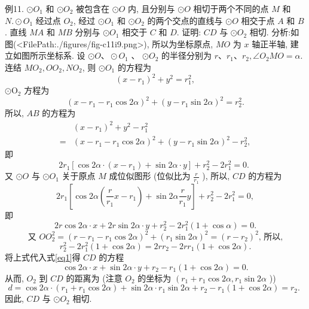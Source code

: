 例11. $ \odot O_1$ 和 $\odot O_2$ 被包含在 $\odot O$ 内, 且分别与 $\odot O$ 相切于两个不同的点 $M$ 和 $N . \odot O_1$ 经过点 $O_2$, 经过 $\odot O_1$ 和 $\odot O_2$ 的两个交点的直线与 $\odot O$ 相交于点 $A$ 和 $B$. 直线 $M A$ 和 $M B$ 分别与 $\odot O_1$ 相交于 $C$ 和 $D$. 证明: $C D$ 与 $\odot O_2$
相切.
分析:如图(<FilePath:./figures/fig-c11i9.png>), 所以为坐标原点, $M O$ 为 $x$ 轴正半轴, 建立如图所示坐标系.
设 $\odot O 、 \odot O_1$ 、 $\odot O_2$ 的半径分别为 $r 、 r_1 、 r_2, \angle O_2 M O=\alpha$. 连结 $M O_2, O O_2, N O_2$, 则 $\odot O_1$ 的方程为
$$
\left(x-r_1\right)^2+y^2=r_1^2,
$$
$\odot \mathrm{O}_2$ 方程为
$$
\left(x-r_1-r_1 \cos 2 \alpha\right)^2+\left(y-r_1 \sin 2 \alpha\right)^2=r_2^2 .
$$
所以, $A B$ 的方程为
$$
\begin{aligned}
& \left(x-r_1\right)^2+y^2-r_1^2 \\
= & \left(x-r_1-r_1 \cos 2 \alpha\right)^2+\left(y-r_1 \sin 2 \alpha\right)^2-r_2^2,
\end{aligned}
$$
即
$$
2 r_1\left[\cos 2 \alpha \cdot\left(x-r_1\right)+\sin 2 \alpha \cdot y\right]+r_2^2-2 r_1^2=0 \text {. }
$$
又 $\odot O$ 与 $\odot O_1$ 关于原点 $M$ 成位似图形 (位似比为 $\frac{r}{r_1}$ ), 所以, $C D$ 的方程为
$$
2 r_1\left[\cos 2 \alpha\left(\frac{r}{r_1} x-r_1\right)+\sin 2 \alpha \frac{r}{r_1} y\right]+r_2^2-2 r_1^2=0,
$$
即
$$
2 r \cos 2 \alpha \cdot x+2 r \sin 2 \alpha \cdot y+r_2^2-2 r_1^2(1+\cos \alpha)=0 . \label{eq1}
$$
$$
\text { 又 } O O_2^2=\left(r-r_1-r_1 \cos 2 \alpha\right)^2+\left(r_1 \sin 2 \alpha\right)^2=\left(r-r_2\right)^2 \text {, 所以, }
$$
$$
r_2^2-2 r_1^2(1+\cos 2 \alpha)=2 r r_2-2 r r_1(1+\cos 2 \alpha) .
$$
将上式代入式\ref{eq1}得 $C D$ 的方程
$$
\cos 2 \alpha \cdot x+\sin 2 \alpha \cdot y+r_2-r_1(1+\cos 2 \alpha)=0 .
$$
从而, $O_2$ 到 $C D$ 的距离为 (注意 $O_2$ 的坐标为 $\left(r_1+r_1 \cos 2 \alpha, r_1 \sin 2 \alpha\right.$ ))
$$
d=\cos 2 \alpha \cdot\left(r_1+r_1 \cos 2 \alpha\right)+\sin 2 \alpha \cdot r_1 \sin 2 \alpha+r_2-r_1(1+\cos 2 \alpha)=r_2 \text {. }
$$
因此, $C D$ 与 $\odot O_2$ 相切.



